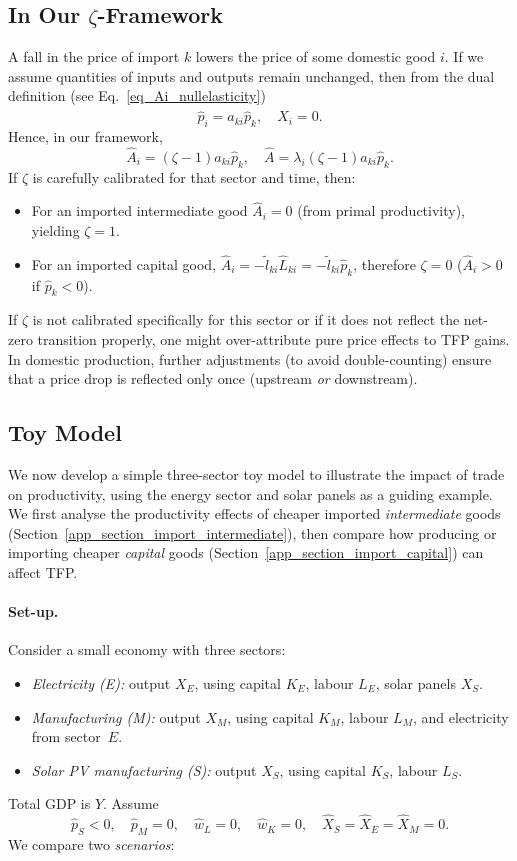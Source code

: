 \documentclass[11pt]{article}
\begin{document}
\subsection{In Our \texorpdfstring{$\zeta$}{zeta}-Framework}
A fall in the price of import $k$ lowers the price of some domestic good $i$. If we assume 
quantities of inputs and outputs remain unchanged, then from the dual definition 
(see Eq.~\ref{eq_Ai_nullelasticity}) 
\[
\hat{p}_i 
 =  
a_{k i} \hat{p}_{k},
\quad
\hat{X}_i 
 =  
0.
\]
Hence, in our framework,
\[
\hat{A}_i 
 =  
(\zeta - 1) a_{k i} \hat{p}_{k},
\quad
\hat{A}
 = 
\lambda_i (\zeta-1) a_{k i} \hat{p}_{k}.
\]
If $\zeta$ is carefully calibrated for that sector and time, then:
\begin{itemize}
    \item For an imported intermediate good $\hat{A}_i=0$ (from primal productivity), yielding $\zeta = 1$.
    \item For an imported capital good,  $\hat{A}_i=-\tilde{l}_{ki}\hat{L}_{ki}=-\tilde{l}_{ki}\hat{p}_{k}$, therefore $\zeta=0$ ($\hat{A}_i>0$ if $\hat{p}_k<0$).
\end{itemize}

If $\zeta$ is not calibrated specifically for this sector or if it does not reflect the net-zero 
transition properly, one might over-attribute pure price effects to TFP gains. In domestic 
production, further adjustments (to avoid double-counting) ensure that a price drop is reflected 
only once (upstream \emph{or} downstream).

\subsection{Toy Model}
\label{sec:toy_model}
We now develop a simple three-sector toy model to illustrate the impact of trade on productivity, 
using the energy sector and solar panels as a guiding example. 
We first analyse the productivity effects of cheaper imported \emph{intermediate} goods 
(Section~\ref{app_section_import_intermediate}), then compare how producing or importing 
cheaper \emph{capital} goods (Section~\ref{app_section_import_capital}) can affect TFP.

\paragraph{Set-up.}
Consider a small economy with three sectors:
\begin{itemize}
\item \textit{Electricity (E):} output $X_E$, using capital $K_E$, labour $L_E$, solar panels $X_S$.
\item \textit{Manufacturing (M):} output $X_M$, using capital $K_M$, labour $L_M$, 
      and electricity from sector~$E$.
\item \textit{Solar PV manufacturing (S):} output $X_S$, using capital $K_S$, labour $L_S$.
\end{itemize}
Total GDP is $Y$. Assume
\[
    \hat{p}_S < 0,\quad 
    \hat{p}_M = 0,\quad
    \hat{w}_L = 0,\quad
    \hat{w}_K = 0,\quad 
    \hat{X}_S = \hat{X}_E = \hat{X}_M = 0.
\]
We compare two \textit{scenarios}:
\end{document}
